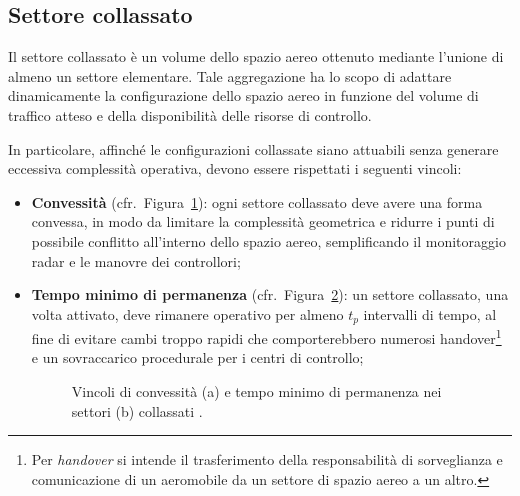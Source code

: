 \subsection{Settore collassato}
\label{subsec:settore-collassato}

Il settore collassato è un volume dello spazio aereo ottenuto mediante l’unione di almeno un settore elementare. Tale aggregazione ha lo scopo di adattare dinamicamente la configurazione dello spazio aereo in funzione del volume di traffico atteso e della disponibilità delle risorse di controllo.

In particolare, affinché le configurazioni collassate siano attuabili senza generare eccessiva complessità operativa, devono essere rispettati i seguenti vincoli:
\DisablePunct
\begin{itemize}
  \item {\bf Convessità} (cfr.~Figura~\ref{fig:convexity}): ogni settore collassato deve avere una forma convessa, in modo da limitare la complessità geometrica e ridurre i punti di possibile conflitto all’interno dello spazio aereo, semplificando il monitoraggio radar e le manovre dei controllori;
  \item {\bf Tempo minimo di permanenza} (cfr.~Figura~\ref{fig:minstay}): un settore collassato, una volta attivato, deve rimanere operativo per almeno \(t_p\) intervalli di tempo, al fine di evitare cambi troppo rapidi che comporterebbero numerosi handover\footnote{Per \emph{handover} si intende il trasferimento della responsabilità di sorveglianza e comunicazione di un aeromobile da un settore di spazio aereo a un altro.} e un sovraccarico procedurale per i centri di controllo;
 \clearpage
  \begin{figure}[H]
    \centering
    \begin{subfigure}[b]{0.45\textwidth}
      \centering
      
      \label{fig:convexity}
    \end{subfigure}\hfill
    \begin{subfigure}[b]{0.45\textwidth}
      \centering
      
      \label{fig:minstay}
    \end{subfigure}
    \caption{Vincoli di convessità (a) e tempo minimo di permanenza nei settori (b) collassati \cite{treimuth2018dynamic}.}
    \label{fig:constraints_ab}
  \end{figure}


\end{itemize}
